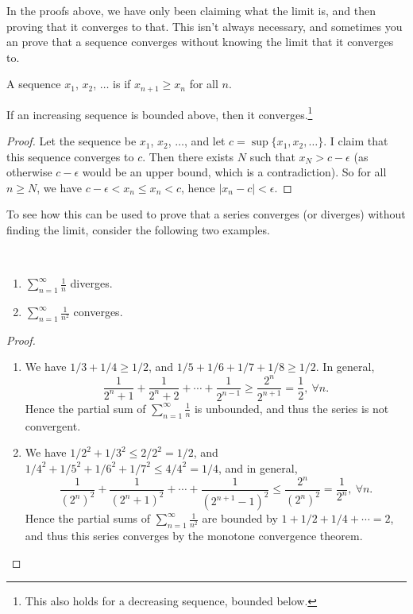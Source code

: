 In the proofs above, we have only been claiming what the limit is, and then proving that it converges to that. This isn't always necessary, and sometimes you an prove that a sequence converges without knowing the limit that it converges to.

\begin{definition}
	A sequence $x_1$, $x_2$, $\dots$ is  if $x_{n + 1} \geq x_n$ for all $n$.
\end{definition}

\begin{theorem}
	If an increasing sequence is bounded above, then it converges.\footnote{
		This also holds for a decreasing sequence, bounded below.}
\end{theorem}
\begin{proof}
	Let the sequence be $x_1$, $x_2$, $\dots$, and let $c = \sup \{x_1, x_2, \dots\}$. I claim that this sequence converges to $c$. Then there exists $N$ such that $x_N > c - \epsilon$ (as otherwise $c - \epsilon$ would be an upper bound, which is a contradiction). So for all $n \geq N$, we have $c - \epsilon < x_n \leq x_n < c$, hence $|x_n - c| < \epsilon$.
\end{proof}

To see how this can be used to prove that a series converges (or diverges) without finding the limit, consider the following two examples.
\begin{proposition}~
	    \vspace*{-1.5\baselineskip}
	\begin{enumerate}[label=(\roman*)]
	    \item $\displaystyle \sum_{n = 1}^{\infty} \frac{1}{n}$ diverges.
	    \item $\displaystyle \sum_{n = 1}^{\infty} \frac{1}{n^2}$ converges.
	\end{enumerate}
\end{proposition}
\begin{proof}$ $
\begin{enumerate}[label=(\roman*)]
	\item We have $1/3 + 1/4 \geq 1/2$, and $1/5 + 1/6 + 1/7 + 1/8 \geq 1/2$. In general,
	$$
	\frac{1}{2^n + 1} + \frac{1}{2^n + 2} + \cdots + \frac{1}{2^{n - 1}} \geq \frac{2^n}{2^{n + 1}} = \frac{1}{2},\  \forall n.
	$$
	Hence the partial sum of $\sum_{n = 1}^{\infty} \frac{1}{n}$ is unbounded, and thus the series is not convergent.
	\item We have $1/2^2 + 1/3^2 \leq 2/2^2 = 1/2$, and $1/4^2 + 1/5^2 + 1/6^2 + 1/7^2 \leq 4/4^2 = 1/4$, and in general,
	$$
	\frac{1}{(2^n)^2} + \frac{1}{(2^n + 1)^2} + \cdots + \frac{1}{(2^{n + 1} - 1)^2} \leq \frac{2^n}{(2^n)^2} = \frac{1}{2^n}, \ \forall n.
	$$
	Hence the partial sums of $\sum_{n = 1}^\infty \frac{1}{n^2}$ are bounded by $1 + 1/2 + 1/4 + \cdots = 2$, and thus this series converges by the monotone convergence theorem.
\end{enumerate}
\end{proof}

